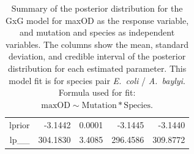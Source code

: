 \begin{table}[ht]
\begin{tabular}{rrrrr}
  lprior & -3.1442 & 0.0001 & -3.1445 & -3.1440 \\ 
  lp\_\_ & 304.1830 & 3.4085 & 296.4586 & 309.8772 \\ 
   \hline
\end{tabular}
\caption{Summary of the posterior distribution for the GxG model for maxOD as the response variable, and mutation and species as independent variables. The columns show the mean, standard deviation, and credible interval of the posterior distribution for each estimated parameter. This model fit is for species pair \textit{E.~coli} / \textit{A.~baylyi}.  Formula used for fit: $\text{maxOD} \sim \text{Mutation} * \text{Species}$.} 
\label{supptab:GxG_maxOD_EC_AB}
\end{table}



